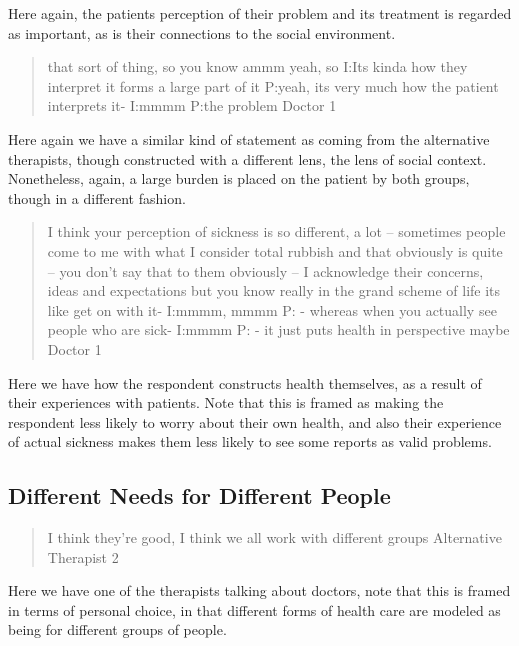 Here again, the patients perception of their problem and its treatment is regarded as important, as is their connections to the social environment. 

\begin{quotation}
  
that sort of thing, so you know ammm yeah, so 
I:Its kinda how they interpret it forms a large part of it
P:yeah, its very much how the patient interprets it-
I:mmmm
P:the problem 
Doctor 1
\end{quotation}

Here again we have a similar kind of statement as coming from the alternative therapists, though constructed with a different lens, the lens of social context. Nonetheless, again, a large burden is placed on the patient by both groups, though in a different fashion. 

\begin{quotation}
  I think your perception of sickness is so different, a lot – sometimes people come to me with what I consider total rubbish and that obviously is quite – you don't say that to them obviously – I acknowledge their concerns, ideas and expectations but you know really in the grand scheme of life its like get on with it-
I:mmmm, mmmm
P: - whereas when you actually see people who are sick-
I:mmmm
P: - it just puts health in perspective maybe 
Doctor 1
\end{quotation}

Here we have how the respondent constructs health themselves, as a result of their experiences with patients. Note that this is framed as making the respondent less likely to worry about their own health, and also their experience of actual sickness makes them less likely to see some reports as valid problems. 


\subsection{Different Needs for Different People}
\label{sec:diff-needs-diff}

\begin{quotation}
  I think  they're good, I think we all work with different groups
Alternative Therapist 2
\end{quotation}

Here we have one of the therapists talking about doctors, note that this is framed in terms of personal choice, in that different forms of health care are modeled as being for different groups of people. 

